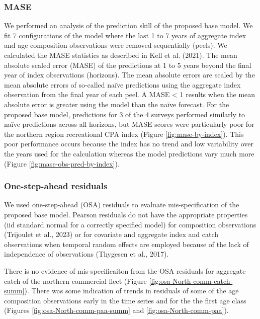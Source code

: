 \documentclass[
]{article}
\begin{document}
\hypertarget{mase}{%
\subsubsection{MASE}\label{mase}}

We performed an analysis of the prediction skill of the proposed base model. We fit 7 configurations of the model where the last 1 to 7 years of aggregate index and age composition observations were removed sequentially (peels). We calculated the MASE statistics as described in Kell et al. (2021). The mean absolute scaled error (MASE) of the predictions at 1 to 5 years beyond the final year of index observations (horizons). The mean absolute errors are scaled by the mean absolute errors of so-called naïve predictions using the aggregate index observation from the final year of each peel. A MASE \textless{} 1 results when the mean absolute error is greater using the model than the naïve forecast. For the proposed base model, predictions for 3 of the 4 surveys performed similarly to naïve predictions across all horizons, but MASE scores were particularly poor for the northern region recreational CPA index (Figure \ref{fig:mase-by-index}). This poor performance occurs because the index has no trend and low variability over the years used for the calculation whereas the model predictions vary much more (Figure \ref{fig:mase-obs-pred-by-index}).

\hypertarget{one-step-ahead-residuals}{%
\subsubsection{One-step-ahead residuals}\label{one-step-ahead-residuals}}

We used one-step-ahead (OSA) residuals to evaluate mis-specification of the proposed base model. Pearson residuals do not have the appropriate properties (iid standard normal for a correctly specified model) for composition observations (Trijoulet et al., 2023) or for covariate and aggregate index and catch observations when temporal random effects are employed because of the lack of independence of observations (Thygesen et al., 2017).

There is no evidence of mis-specificaiton from the OSA residuals for aggregate catch of the northern commercial fleet (Figure \ref{fig:osa-North-comm-catch-summ}). There was some indication of trends in residuals of some of the age composition observations early in the time series and for the the first age class (Figures \ref{fig:osa-North-comm-paa-summ} and \ref{fig:osa-North-comm-paa}).
\end{document}
